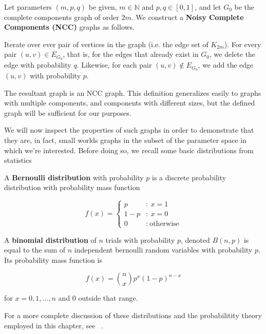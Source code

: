\begin{definition}
  \label{def:ncc}
  Let parameters $(m,p,q)$ be given, $m \in \mathbb{N}$ and $p,q \in [0,1]$, and let $G_0$ be the
  complete components graph of order $2m$. We construct a \textbf{Noisy Complete Components (NCC)}
  graphs as follows.

  Iterate over ever pair of vertices in the graph (i.e. the edge set of
  $K_{2m}$). For every pair $(u,v) \in E_{G_0}$, that is, for the edges that
  already exist in $G_0$, we delete the edge with probability $q$. Likewise, for
  each pair $(u,v) \notin E_{G_0}$, we add the edge $(u,v)$ with probability
  $p$.

  The resultant graph is an NCC graph. This definition generalizes easily 
  to graphs with multiple components, and components with different sizes, 
  but the defined graph will be sufficient for our purposes.
\end{definition}

We will now inspect the properties of such graphs in order to demonstrate that they are, in fact,
small worlds graphs in the subset of the parameter space in which we're interested. Before doing so,
we recall some basic distributions from statistics

\begin{definition}
  A \textbf{Bernoulli distribution} with probability $p$ is a discrete probability distribution
  with probability mass function

  \[
    f(x) =
      \begin{cases}
        p &:~ x = 1 \\
        1-p &:~ x = 0 \\
        0 &:~ \text{otherwise}
      \end{cases}
    \]

  A \textbf{binomial distribution} of $n$ trials with probability $p$, denoted $B(n,p)$ is equal to
  the sum of $n$ independent bernoulli random variables with probability $p$. Its probability mass
  function is

  \[
    f(x) = {n \choose x} p^x(1-p)^{n-x}
  \]

  for $x = 0,1,...,n$ and $0$ outside that range.

  For a more complete discussion of these distributions and the probabilitity theory employed in
  this chapter, see ~\cite{CaseBerg:01}.
\end{definition}


